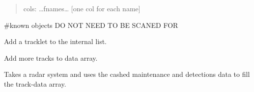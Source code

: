 \documentclass[letterpaper,10pt,english]{sphinxmanual}
\begin{document}
\begin{fulllineitems}
\begin{quote}
cols: …fnames… {[}one col for each name{]}
\end{quote}

\#known objects DO NOT NEED TO BE SCANED FOR

\begin{fulllineitems}
\label{\detokenize{modules/catalogue:catalogue.Catalogue.add_tracklet}}
Add a tracklet to the internal list.

\end{fulllineitems}


\begin{fulllineitems}
\label{\detokenize{modules/catalogue:catalogue.Catalogue.add_tracks}}
Add more tracks to data array.

\end{fulllineitems}


\begin{fulllineitems}
\label{\detokenize{modules/catalogue:catalogue.Catalogue.compile_tracks}}
Takes a radar system and uses the cashed maintenance and detections data to fill the track-data array.

\end{fulllineitems}


\begin{fulllineitems}
\label{\detokenize{modules/catalogue:catalogue.Catalogue.detection_summary}}
\end{fulllineitems}


\begin{fulllineitems}
\label{\detokenize{modules/catalogue:catalogue.Catalogue.detection_summary_plot}}
\end{fulllineitems}


\end{fulllineitems}
\end{document}
